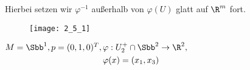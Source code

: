 \begin{rem*}	
	Hierbei setzen wir $ \varphi^{-1} $ außerhalb von $ \varphi(U) $ glatt auf $\R^m$ fort.
\end{rem*}

\begin{exmp*}
	\begin{minipage}{\linewidth}
		\begin{wrapfigure}{R}{0.3\textwidth}
			\texttt{[image: 2\_5\_1]}
		\end{wrapfigure}
		$ M = \Sbb^1, p = (0,1,0)^T, \begin{aligned}[t]
			&\varphi: U_2^+ \cap \Sbb^2 \to \R^2, \\&\varphi(x) = (x_1,x_3)
		\end{aligned} $
	\end{minipage}
		

\end{exmp*}
